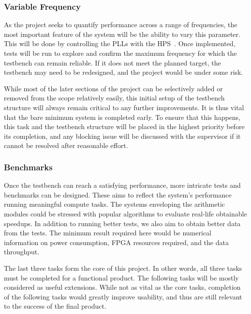 \subsubsection{\textbf{Variable Frequency}}
As the project seeks to quantify performance across a range of frequencies,
the most important feature of the system will be the ability to vary this
parameter.
This will be done by controlling the PLLs with the HPS~\cite{Altera4}.
Once implemented, tests will be run to explore and confirm the maximum
frequency for which the testbench can remain reliable.
If it does not meet the planned target, the testbench may need to be redesigned,
and the project would be under some risk.

While most of the later sections of the project can be selectively added or
removed from the scope relatively easily, this initial setup of the testbench
structure will always remain critical to any further improvements.
It is thus vital that the bare minimum system is completed early.
To ensure that this happens, this task and the testbench structure will be
placed in the highest priority before its completion, and any blocking issue
will be discussed with the supervisor if it cannot be resolved after reasonable
effort.

\subsubsection{\textbf{Benchmarks}}
Once the testbench can reach a satisfying performance, more intricate tests and
benchmarks can be designed.
These aims to reflect the system's performance running meaningful compute
tasks.
The systems enveloping the arithmetic modules could be stressed with popular
algorithms to evaluate real-life obtainable speedups.
In addition to running better tests, we also aim to obtain better data from
the tests.
The minimum result required here would be numerical information on power
consumption, FPGA resources required, and the data throughput.

The last three tasks form the core of this project.
In other words, all three tasks must be completed for a functional product.
The following tasks will be mostly considered as useful extensions.
While not as vital as the core tasks, completion of the following tasks would
greatly improve usability, and thus are still relevant to the success
of the final product.

